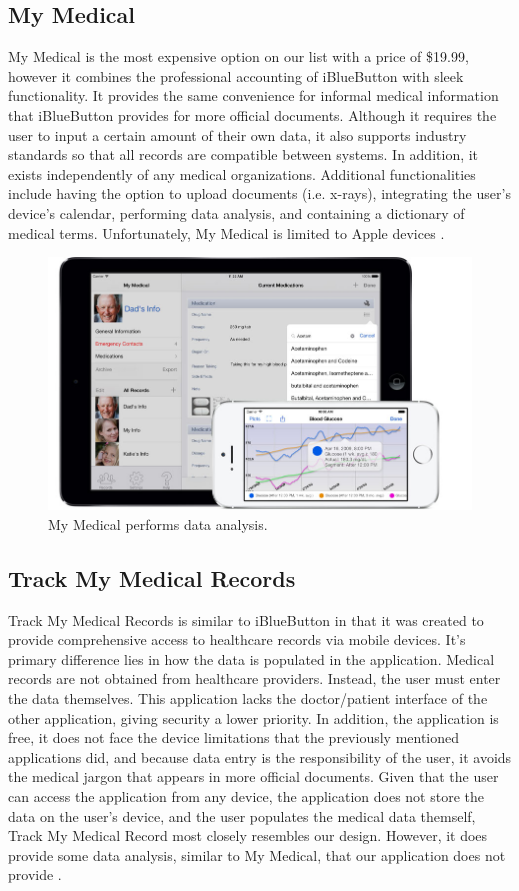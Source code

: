 \documentclass[twocolumn,12pt]{article}
\begin{document}
\subsection{My Medical}
My Medical is the most expensive option on our list with a price of \$19.99, however it combines the professional accounting of iBlueButton with sleek functionality. It provides the same convenience for informal medical information that iBlueButton provides for more official documents. Although it requires the user to input a certain amount of their own data, it also supports industry standards so that all records are compatible between systems. In addition, it exists independently of any medical organizations. Additional functionalities include having the option to upload documents (i.e. x-rays), integrating the user's device's calendar, performing data analysis, and containing a dictionary of medical terms. Unfortunately, My Medical is limited to Apple devices \cite{mymedical}.

\begin{figure}[!htb] 
	\centering
	\includegraphics[scale=.2]{./490/splash_ios.jpg}
	\caption{My Medical performs data analysis.}
\end{figure}

\subsection{Track My Medical Records}
Track My Medical Records is similar to iBlueButton in that it was created to provide comprehensive access to healthcare records via mobile devices. It's primary difference lies in how the data is populated in the application. Medical records are not obtained from healthcare providers. Instead, the user must enter the data themselves. This application lacks the doctor/patient interface of the other application, giving security a lower priority. In addition, the application is free, it does not face the device limitations that the previously mentioned applications did, and because data entry is the responsibility of the user, it avoids the medical jargon that appears in more official documents. Given that the user can access the application from any device, the application does not store the data on the user's device,  and the user populates the medical data themself, Track My Medical Record most closely resembles our design. However, it does provide some data analysis, similar to My Medical, that our application does not provide \cite{freehealthtrack}.
\end{document}
